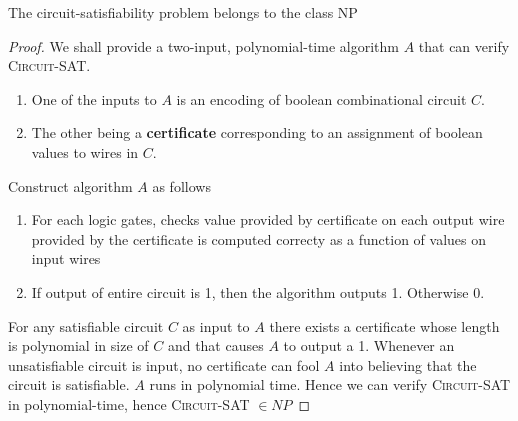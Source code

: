 \documentclass[11pt]{article}
\begin{document}
\begin{lemma*}
    The circuit-satisfiability problem belongs to the class NP 
    \begin{proof}
        We shall provide a two-input, polynomial-time algorithm $A$ that can verify \textsc{Circuit-SAT}. 
        \begin{enumerate}
            \item One of the inputs to $A$ is an encoding of boolean combinational circuit $C$.
            \item The other being a \textbf{certificate} corresponding to an assignment of boolean values to wires in $C$.
        \end{enumerate}
        Construct algorithm $A$ as follows 
        \begin{enumerate}
            \item For each logic gates, checks value provided by certificate on each output wire provided by the certificate is computed correcty as a function of values on input wires
            \item If output of entire circuit is 1, then the algorithm outputs 1. Otherwise 0.
        \end{enumerate}
        For any satisfiable circuit $C$ as input to $A$ there exists a certificate whose length is polynomial in size of $C$ and that causes $A$ to output a 1. Whenever an unsatisfiable circuit is input, no certificate can fool $A$ into believing that the circuit is satisfiable. $A$ runs in polynomial time. Hence we can verify \textsc{Circuit-SAT} in polynomial-time, hence \textsc{Circuit-SAT} $\in NP$
    \end{proof}
\end{lemma*}
\end{document}
